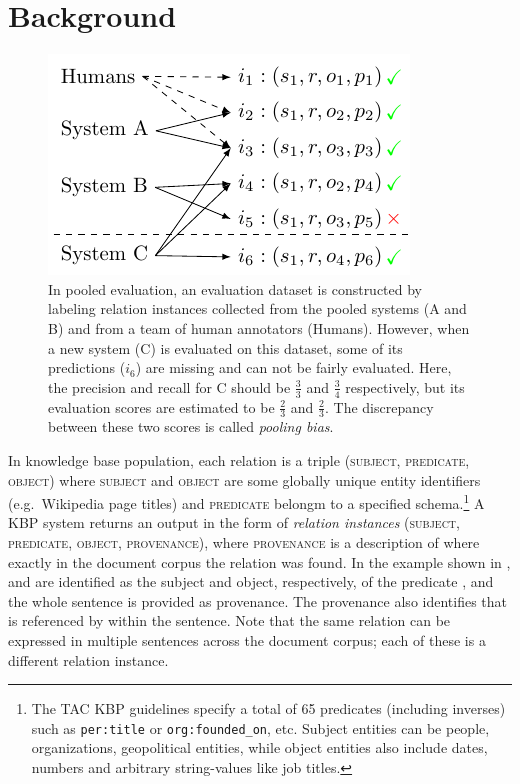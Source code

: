 \section{Background}
\label{sec:setup}
\begin{figure}[t]
  \centering
  \includegraphics[width=0.5\columnwidth]{figures/pooling}
  \caption[Pooled evaluation]{\label{fig:pooling}
  In pooled evaluation, an evaluation dataset is constructed by labeling relation instances collected from the pooled systems (A and B) and from a team of human annotators (Humans).
  However, when a new system (C) is evaluated on this dataset, some of its predictions ($i_6$) are missing and can not be fairly evaluated.
  Here, the precision and recall for C should be $\frac{3}{3}$ and $\frac{3}{4}$ respectively, but its evaluation scores are estimated to be $\frac{2}{3}$ and $\frac{2}{3}$.
  The discrepancy between these two scores is called \textit{pooling bias}.
  }
\end{figure}

In knowledge base population,
  each relation is a triple (\textsc{subject}, \textsc{predicate}, \textsc{object}) where \textsc{subject} and \textsc{object} are some globally unique entity identifiers (e.g.\, Wikipedia page titles) and \textsc{predicate} belongm to a specified schema.\footnote{%
    The TAC KBP guidelines specify a total of 65 predicates (including inverses) such as 
     \texttt{per:title} or \texttt{org:founded\_on}, etc.
    Subject entities can be people, organizations, geopolitical entities, while object entities also include 
    dates, numbers and arbitrary string-values like job titles.
     }
A KBP system returns an output in the form of \textit{relation instances} (\textsc{subject}, \textsc{predicate}, \textsc{object}, \textsc{provenance}), where \textsc{provenance} is a description of where exactly in the document corpus the relation was found. 
In the example shown in ,
 and  are identified as the subject and object, respectively, of the predicate , and the whole sentence is provided as provenance.
The provenance also identifies that  is referenced by  within the sentence.
Note that the same relation can be expressed in multiple sentences across the document corpus; each of these is a different relation instance.

